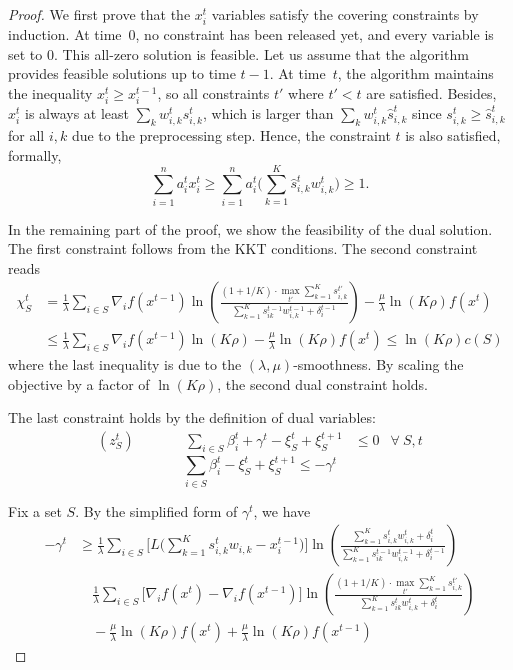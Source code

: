 \begin{proof}
We first prove that the $x_{i}^{t}$ variables satisfy the covering constraints by induction. At time~0, no constraint has been released yet, and every variable is set to 0. This all-zero solution is feasible. Let us assume that the algorithm provides feasible solutions up to time $t-1$. At time~$t$, the algorithm maintains the inequality $x_{i}^{t} \geq x_{i}^{t-1}$, so all constraints $t'$ where $t' < t$ are satisfied. Besides, $x_{i}^{t}$ is always at least
$\sum_{k} w_{i,k}^{t} s_{i,k}^{t}$, which is larger than $\sum_{k} w_{i,k}^{t} \hat{s}_{i,k}^{t}$ since $s_{i,k}^{t} \geq \hat{s}_{i,k}^{t}$
for all $i,k$ due to the preprocessing step. Hence, the constraint $t$ is also satisfied, formally,
$$
\sum_{i=1}^{n} a_{i}^{t} x_{i}^{t}  \geq \sum_{i=1}^{n} a_{i}^{t} \biggl( \sum_{k=1}^{K} \hat{s}_{i,k}^{t} w_{i,k}^{t} \biggr) \geq 1.
$$

\clearpage

In the remaining part of the proof, we show the feasibility of the dual solution.
The first constraint follows from the KKT conditions.
The second constraint reads
%
\begin{align*}
\chi_{S}^{t} &= \frac{1}{\lambda} \sum_{i \in S} \nabla_{i} f(x^{t-1}) \ln \left( \frac{(1 + 1/K) \cdot \max_{t'} \sum_{k=1}^{K} s_{i,k}^{t'}}{\sum_{k=1}^{K}  s_{ik}^{t-1}w_{i,k}^{t-1}  + \delta_{i}^{t-1}} \right) - \frac{\mu}{\lambda} \ln(K\rho) f(x^{t})  \\
&\leq \frac{1}{\lambda} \sum_{i \in S} \nabla_{i} f(x^{t-1}) \ln(K\rho)  - \frac{\mu}{\lambda} \ln(K\rho) f(x^{t})
\leq  \ln(K\rho) c(S)
\end{align*}
%
where the last inequality is due to the $(\lambda,\mu)$-smoothness. By scaling the objective by a factor of $\ln (K\rho)$, the second dual constraint holds.

The last constraint holds by the definition of dual variables:
\begin{align*}
  (z_{S}^{t}) \qquad && \sum_{i \in S}\beta_{i}^{t} + \gamma^{t} - \xi_{S}^{t} + \xi_{S}^{t+1}  &\leq 0  &\forall\ S,t
\end{align*}
\[\sum_{i \in S}\beta_{i}^{t} - \xi_{S}^{t} + \xi_{S}^{t+1}  \leq -\gamma^{t}\]

Fix a set $S$. By the simplified form of $\gamma^{t}$, we have
\begin{align*}
-\gamma^{t} &\geq     \frac{1}{\lambda} \sum_{i \in S} \biggl[ L\biggl( \sum_{k=1}^{K} s_{i,k}^{t} w_{i,k}  - x_{i}^{t-1} \biggr) \biggr]  \ln \left( \frac{\sum_{k=1}^{K} s_{i,k}^{t} w_{i,k}^{t} + \delta_{i}^{t}}{\sum_{k=1}^{K}  s_{ik}^{t-1}w_{i,k}^{t-1}  + \delta_{i}^{t-1}} \right) \\
        & \quad  \frac{1}{\lambda} \sum_{i \in S} \biggl[ \nabla_{i} f(x^{t}) - \nabla_{i} f(x^{t-1}) \biggr] \ln \left( \frac{(1 + 1/K) \cdot \max_{t'} \sum_{k=1}^{K} s_{i,k}^{t'}}{\sum_{k=1}^{K}  s_{ik}^{t}w_{i,k}^{t}  + \delta_{i}^{t}} \right)  \\
    & \quad - \frac{\mu}{\lambda} \ln(K\rho) f(x^{t}) + \frac{\mu}{\lambda} \ln(K\rho) f(x^{t-1})
\end{align*}


\end{proof}
